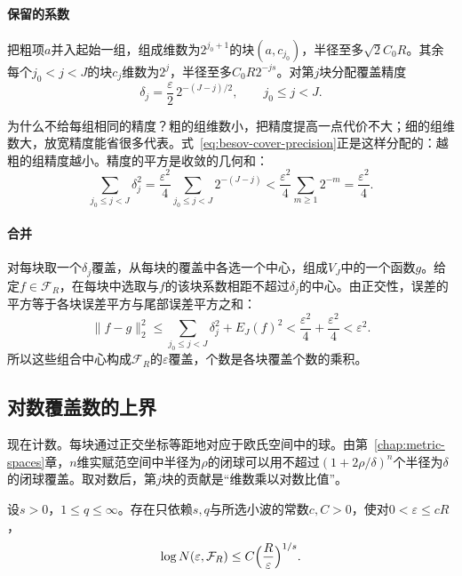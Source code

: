 \paragraph{保留的系数}
把粗项$a$并入起始一组，组成维数为$2^{j_0+1}$的块$(a,c_{j_0})$，半径至多$\sqrt2C_0R$。其余每个$j_0<j<J$的块$c_j$维数为$2^j$，半径至多$C_0R2^{-js}$。对第$j$块分配覆盖精度
\begin{equation}
 \delta_j=\frac\varepsilon2\,2^{-(J-j)/2},\qquad j_0\leq j<J .
 \label{eq:besov-cover-precision}
\end{equation}

为什么不给每组相同的精度？粗的组维数小，把精度提高一点代价不大；细的组维数大，放宽精度能省很多代表。式~\eqref{eq:besov-cover-precision}正是这样分配的：越粗的组精度越小。精度的平方是收敛的几何和：
\[
 \sum_{j_0\leq j<J}\delta_j^2=\frac{\varepsilon^2}{4}\sum_{j_0\leq j<J}2^{-(J-j)}<\frac{\varepsilon^2}{4}\sum_{m\geq1}2^{-m}=\frac{\varepsilon^2}4 .
\]

\paragraph{合并}
对每块取一个$\delta_j$覆盖，从每块的覆盖中各选一个中心，组成$V_J$中的一个函数$g$。给定$f\in\mathcal F_R$，在每块中选取与$f$的该块系数相距不超过$\delta_j$的中心。由正交性，误差的平方等于各块误差平方与尾部误差平方之和：
\[
 \lVert f-g\rVert_2^2\leq\sum_{j_0\leq j<J}\delta_j^2+E_J(f)^2<\frac{\varepsilon^2}4+\frac{\varepsilon^2}4<\varepsilon^2 .
\]
所以这些组合中心构成$\mathcal F_R$的$\varepsilon$覆盖，个数是各块覆盖个数的乘积。

\subsection{对数覆盖数的上界}
\label{sec:besov-entropy-upper}

现在计数。每块通过正交坐标等距地对应于欧氏空间中的球。由第~\ref{chap:metric-spaces}章，$n$维实赋范空间中半径为$\rho$的闭球可以用不超过$(1+2\rho/\delta)^n$个半径为$\delta$的闭球覆盖。取对数后，第$j$块的贡献是“维数乘以对数比值”。

\begin{theorem}[对数覆盖数的上界]
\label{thm:besov-entropy-upper}
设$s>0$，$1\leq q\leq\infty$。存在只依赖$s,q$与所选小波的常数$c,C>0$，使对$0<\varepsilon\leq cR$，
\begin{equation}
 \log N(\varepsilon,\mathcal F_R)\leq C\Bigl(\frac R\varepsilon\Bigr)^{1/s}.
 \label{eq:besov-entropy-upper}
\end{equation}
\end{theorem}

